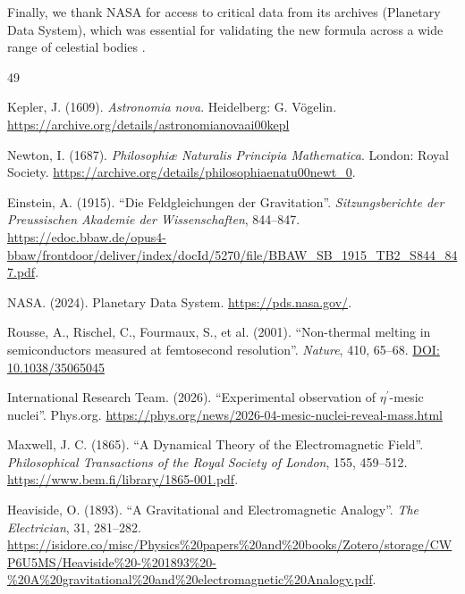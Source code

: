 \documentclass[11pt, a4paper]{article}
\newcommand{\doi}[1]{\href{https://doi.org/#1}{DOI: #1}}
\begin{document}
Finally, we thank NASA for access to critical data from its archives (Planetary Data System), which was essential for validating the new formula across a wide range of celestial bodies \cite{nasa2024}.

\begin{thebibliography}{49}

  Kepler, J. (1609). \textit{Astronomia nova}. Heidelberg: G. Vögelin.
  \url{https://archive.org/details/astronomianovaai00kepl}

  Newton, I. (1687). \textit{Philosophiæ Naturalis Principia Mathematica}. London: Royal Society. 
  \url{https://archive.org/details/philosophiaenatu00newt_0}.

  Einstein, A. (1915). ``Die Feldgleichungen der Gravitation''. \textit{Sitzungsberichte der Preussischen Akademie der Wissenschaften}, 844–847. 
  \url{https://edoc.bbaw.de/opus4-bbaw/frontdoor/deliver/index/docId/5270/file/BBAW_SB_1915_TB2_S844_847.pdf}.

  NASA. (2024). Planetary Data System. \url{https://pds.nasa.gov/}.

  Rousse, A., Rischel, C., Fourmaux, S., et al. (2001). ``Non-thermal melting in semiconductors measured at femtosecond resolution''. \textit{Nature}, 410, 65--68. 
  \doi{10.1038/35065045}

  International Research Team. (2026). ``Experimental observation of $\eta^{\prime}$-mesic nuclei''. Phys.org. 
  \url{https://phys.org/news/2026-04-mesic-nuclei-reveal-mass.html}

  Maxwell, J. C. (1865). ``A Dynamical Theory of the Electromagnetic Field''. \textit{Philosophical Transactions of the Royal Society of London}, 155, 459–512. 
  \url{https://www.bem.fi/library/1865-001.pdf}.

  Heaviside, O. (1893). ``A Gravitational and Electromagnetic Analogy''. \textit{The Electrician}, 31, 281–282. 
  \url{https://isidore.co/misc/Physics%20papers%20and%20books/Zotero/storage/CWP6U5MS/Heaviside%20-%201893%20-%20A%20gravitational%20and%20electromagnetic%20Analogy.pdf}.


\end{thebibliography}
\end{document}
